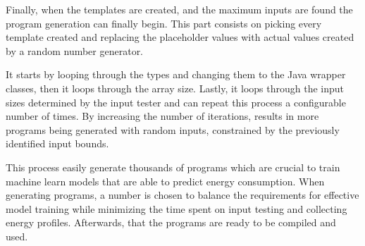 Finally, when the templates are created, and the maximum inputs are found the program generation can finally begin. This part consists on picking every template created and replacing the placeholder values with actual values created by a random number generator.

It starts by looping through the types and changing them to the Java wrapper classes, then it loops through the array size. Lastly, it loops through the input sizes determined by the input tester and can repeat this process a configurable number of times. By increasing the number of iterations, results in more programs being generated with random inputs, constrained by the previously identified input bounds.

This process easily generate thousands of programs which are crucial to train machine learn models that are able to predict energy consumption. When generating programs, a number is chosen to balance the requirements for effective model training while minimizing the time spent on input testing and collecting energy profiles. Afterwards, that the programs are ready to be compiled and used.